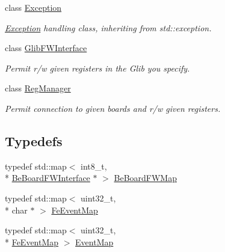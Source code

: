 \begin{DoxyCompactItemize}
class \hyperlink{class_ph2___hw_interface_1_1_exception}{Exception}
\begin{DoxyCompactList}\small\item\em \hyperlink{class_ph2___hw_interface_1_1_exception}{Exception} handling class, inheriting from std\-::exception. \end{DoxyCompactList}\item 
class \hyperlink{class_ph2___hw_interface_1_1_glib_f_w_interface}{Glib\-F\-W\-Interface}
\begin{DoxyCompactList}\small\item\em Permit r/w given registers in the Glib you specify. \end{DoxyCompactList}\item 
class \hyperlink{class_ph2___hw_interface_1_1_reg_manager}{Reg\-Manager}
\begin{DoxyCompactList}\small\item\em Permit connection to given boards and r/w given registers. \end{DoxyCompactList}\end{DoxyCompactItemize}
\subsection*{Typedefs}
\begin{DoxyCompactItemize}
\item 
typedef std\-::map$<$ int8\-\_\-t, \\*
\hyperlink{class_ph2___hw_interface_1_1_be_board_f_w_interface}{Be\-Board\-F\-W\-Interface} $\ast$ $>$ \hyperlink{namespace_ph2___hw_interface_ac35d341eb47fa7cbe4d28ccbc6ab4875}{Be\-Board\-F\-W\-Map}
\item 
typedef std\-::map$<$ uint32\-\_\-t, \\*
char $\ast$ $>$ \hyperlink{namespace_ph2___hw_interface_a50d97ee46941c2c0c2ecadc929e41b05}{Fe\-Event\-Map}
\item 
typedef std\-::map$<$ uint32\-\_\-t, \\*
\hyperlink{namespace_ph2___hw_interface_a50d97ee46941c2c0c2ecadc929e41b05}{Fe\-Event\-Map} $>$ \hyperlink{namespace_ph2___hw_interface_acf9f41d647e7a3ad9bae233b04b9e3bc}{Event\-Map}
\end{DoxyCompactItemize}

